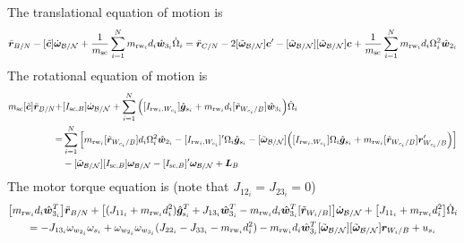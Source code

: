 The translational equation of motion is
\begin{equation}
\ddot{\bm r}_{B/N} -[\tilde{\bm{c}}]\dot{\bm\omega}_{\cal B/N} +\frac{1}{m_{\text{sc}}}\sum\limits_{i=1}^{N}m_{\text{rw}_i}d_i\hat{\bm{w}}_{3_i}\dot{\Omega}_i = \ddot{\bm r}_{C/N}   - 2[\tilde{\bm\omega}_{\cal B/N}]\bm{c}'-[\tilde{\bm\omega}_{\cal B/N}][\tilde{\bm\omega}_{\cal B/N}]\bm{c} + \frac{1}{m_{\text{sc}}}\sum\limits_{i=1}^{N}m_{\text{rw}_i}d_i\Omega_i^2\hat{\bm{w}}_{2_i}
\label{eq:rBddot}
\end{equation}
The rotational equation of motion is
\begin{equation}
\begin{split}
m_{\text{sc}}[\tilde{\bm c}]\ddot{\bm r}_{B/N} +& [I_{\text{sc},B}]\dot{\bm\omega}_{\cal B/N} +\sum\limits_{i=1}^{N}\Big([I_{\text{rw}_i,W_{c_i}}]\hat{\bm{g}}_{s_i} + m_{\text{rw}_i}d_i[\tilde{\bm{r}}_{W_{c_i}/B}]\hat{\bm{w}}_{3_i}\Big)\dot{\Omega}_i
\\=& 
\sum\limits_{i=1}^{N}\Big[ m_{\text{rw}_i}[\tilde{\bm{r}}_{W_{c_i}/B}]d_i \Omega_i^2\hat{\bm{w}}_{2_i}-[I_{\text{rw}_i,W_{c_i}}]'\Omega_i \hat{\bm{g}}_{s_i} -[\tilde{\bm\omega}_{\cal B/N}]\Big([I_{\text{rw}_i,W_{c_i}}]\Omega_i \hat{\bm{g}}_{s_i}+ m_{\text{rw}_i}[\tilde{\bm{r}}_{W_{c_i}/B}]\bm{r}'_{W_{c_i}/B}\Big)\Big]
\\&  -[\tilde{\bm\omega}_{\cal B/N}][I_{\text{sc},B}]\bm\omega_{\cal B/N}-  [I_{\text{sc},B}]'\bm\omega_{\cal B/N} + \bm{L}_B
\end{split}
\label{eq:rotationalEOM}
\end{equation}
The motor torque equation is (note that $J_{12_i} = J_{23_i} = 0$)
\begin{multline}
\big[m_{\text{rw}_i} d_i \hat{\bm{w}}_{3_i}^T\big]\ddot{\bm{r}}_{B/N} + \big[(J_{11_i} + m_{\text{rw}_i} d_i^2)\hat{\bm g}_{\text{s}_i}^T  + J_{13_i}\hat{\bm w}_{3_i}^T -m_{\text{rw}_i} d_i \hat{\bm{w}}_{3_i}^T [\tilde{\bm r}_{W_i/B}]\big]\dot{\bm\omega}_{\cal B/N} + \big[J_{11_i} + m_{\text{rw}_i} d_i^2\big]\dot{\Omega}_i
\\=   - J_{13_i} \omega_{w_{2_i}}\omega_{s_i}  
+ \omega_{w_{2_i}} \omega_{w_{3_i}} (J_{22_i} - J_{33_i} - m_{\text{rw}_i} d_i^2
) 
-m_{\text{rw}_i} d_i \hat{\bm{w}}_{3_i}^T [\tilde{\bm\omega}_{\cal B/N}] [\tilde{\bm\omega}_{\cal B/N}] \bm r_{W_i/B} + u_{s_i}
\label{eq:motorTorqueFinal}
\end{multline}

